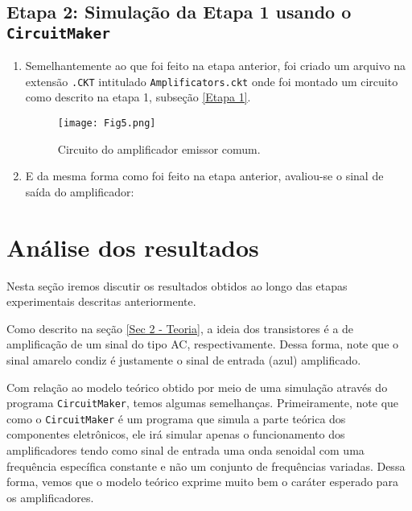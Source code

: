 \documentclass[letterpaper, 12pt]{article}
\begin{document}
\subsection{Etapa 2: Simulação da Etapa 1 usando o \texttt{CircuitMaker}}
\begin{enumerate}
    \item Semelhantemente ao que foi feito na etapa anterior, foi criado um arquivo na extensão \texttt{.CKT} intitulado \texttt{Amplificators.ckt} onde foi montado um circuito como descrito na etapa 1, subseção \ref{Etapa 1}.
    \begin{figure}[h!]
        \centering
        \texttt{[image: Fig5.png]}
        \caption{Circuito do amplificador emissor comum.}
        \label{fig: Circuit_Maker}
    \end{figure}
    
    \item E da mesma forma como foi feito na etapa anterior, avaliou-se o sinal de saída do amplificador:
\end{enumerate}



\section{Análise dos resultados}\label{Sec 4 - Resultados}
Nesta seção iremos discutir os resultados obtidos ao longo das etapas experimentais descritas anteriormente.

Como descrito na seção \ref{Sec 2 - Teoria}, a ideia dos transistores é a de amplificação de um sinal do tipo AC, respectivamente. Dessa forma, note que o sinal amarelo condiz é justamente o sinal de entrada (azul) amplificado.


Com relação ao modelo teórico obtido por meio de uma simulação através do programa \texttt{CircuitMaker}, temos algumas semelhanças. Primeiramente, note que como o \texttt{CircuitMaker} é um programa que simula a parte teórica dos componentes eletrônicos, ele irá simular apenas o funcionamento dos amplificadores tendo como sinal de entrada uma onda senoidal com uma frequência específica constante e não um conjunto de frequências variadas. Dessa forma, vemos que o modelo teórico exprime muito bem o caráter esperado para os amplificadores.
\end{document}
